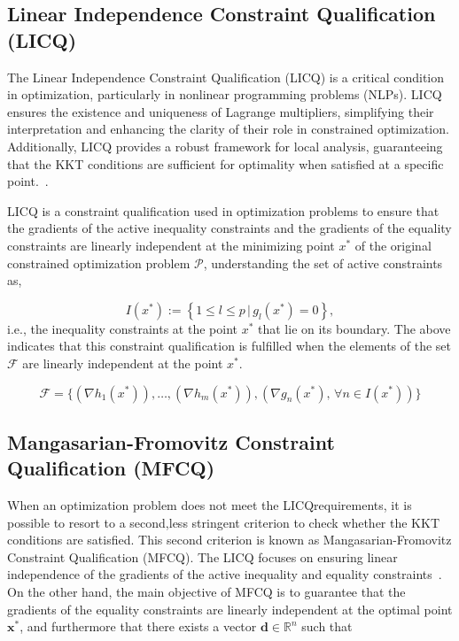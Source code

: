 \subsection{Linear Independence Constraint Qualification (LICQ)}

The Linear Independence Constraint Qualification (LICQ) is a critical condition in optimization, particularly in nonlinear programming problems (NLPs). LICQ ensures the existence and uniqueness of Lagrange multipliers, simplifying their interpretation and enhancing the clarity of their role in constrained optimization. Additionally, LICQ provides a robust framework for local analysis, guaranteeing that the KKT conditions are sufficient for optimality when satisfied at a specific point.~\citep{Bergmann_Herzog_2019}.

LICQ is a constraint qualification used in optimization problems to ensure that the gradients of the active inequality constraints and the gradients of the equality constraints are linearly independent at the minimizing point $x^{*}$ of the original constrained optimization problem $\mathcal{P}$, understanding the set of active constraints as, 

\begin{equation} \label{eq:active_inequalities}
    I(x^*) := \left \{1 \leq l \leq p \,|\, g_l(x^*) = 0\right \}, 
\end{equation}
i.e., the inequality constraints at the point $x^{*}$ that lie on its boundary. The above indicates that this constraint qualification is fulfilled when the elements of the set $\mathcal{F}$ are linearly independent at the point $x^{*}$.

\begin{equation} \label{eq: LICQ }
     \mathcal{F} = \{ (\nabla h_1(x^*)), \ldots, (\nabla h_m(x^*)), (\nabla g_n(x^*), \, \forall n \in I(x^*)) \}    
\end{equation}

\subsection{Mangasarian-Fromovitz Constraint Qualification (MFCQ)}

When an optimization problem does not meet the LICQrequirements, it is possible to resort to a second,less stringent criterion to check whether the KKT conditions are satisfied. This second criterion is known as Mangasarian-Fromovitz Constraint Qualification (MFCQ). The LICQ focuses on ensuring linear independence of the gradients of the active inequality and equality constraints~\citep{BertsekasDimitriP1999Np/D}. On the other hand, the main objective of MFCQ is to guarantee that the gradients of the equality constraints are linearly independent at the optimal point $\mathbf{x}^*$, and furthermore that there exists a vector $\mathbf{d} \in \mathbb{R}^n$ such that

